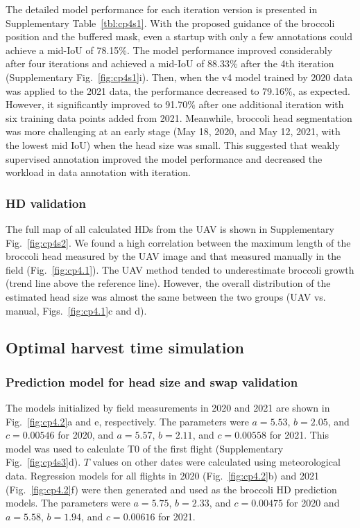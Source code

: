 The detailed model performance for each iteration version is presented in Supplementary Table~\ref{tbl:cp4s1}. With the proposed guidance of the broccoli position and the buffered mask, even a startup with only a few annotations could achieve a mid-IoU of 78.15\%. The model performance improved considerably after four iterations and achieved a mid-IoU of 88.33\% after the 4th iteration (Supplementary Fig.~\ref{fig:cp4s1}i). Then, when the v4 model trained by 2020 data was applied to the 2021 data, the performance decreased to 79.16\%, as expected. However, it significantly improved to 91.70\% after one additional iteration with six training data points added from 2021. Meanwhile, broccoli head segmentation was more challenging at an early stage (May 18, 2020, and May 12, 2021, with the lowest mid IoU) when the head size was small. This suggested that weakly supervised annotation improved the model performance and decreased the workload in data annotation with iteration.

\subsubsection*{HD validation}

The full map of all calculated HDs from the UAV is shown in Supplementary Fig.~\ref{fig:cp4s2}. We found a high correlation between the maximum length of the broccoli head measured by the UAV image and that measured manually in the field (Fig.~\ref{fig:cp4.1}). The UAV method tended to underestimate broccoli growth (trend line above the reference line). However, the overall distribution of the estimated head size was almost the same between the two groups (UAV vs. manual, Figs.~\ref{fig:cp4.1}c and d). 




\subsection{Optimal harvest time simulation}

\subsubsection*{Prediction model for head size and swap validation}

The models initialized by field measurements in 2020 and 2021 are shown in Fig.~\ref{fig:cp4.2}a and e, respectively. The parameters were $a = 5.53$, $b = 2.05$, and $c = 0.00546$ for 2020, and $a = 5.57$, $b = 2.11$, and $c = 0.00558$ for 2021. This model was used to calculate T0 of the first flight (Supplementary Fig.~\ref{fig:cp4s3}d). $T$ values on other dates were calculated using meteorological data. Regression models for all flights in 2020 (Fig.~\ref{fig:cp4.2}b) and 2021 (Fig.~\ref{fig:cp4.2}f) were then generated and used as the broccoli HD prediction models. The parameters were $a = 5.75$, $b = 2.33$, and $c = 0.00475$ for 2020 and $a = 5.58$, $b = 1.94$, and $c = 0.00616$ for 2021.

